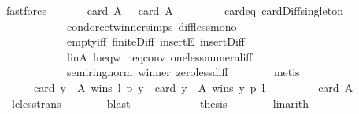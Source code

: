 \begin{isabellebody}
\ fastforce\isanewline
\ \ \ \ \isamarkupfalse%
\ {}{\isacharcolon}{\kern0pt}\ {\isachardoublequoteopen}card\ A\ {\isacharminus}{\kern0pt}{}\ {\isacharless}{\kern0pt}\ card\ A\ {\isacharminus}{\kern0pt}{}{\isachardoublequoteclose}\isanewline
\ \ \ \ \ \ \isamarkupfalse%
\ card{\isacharunderscore}{\kern0pt}{}{\isacharunderscore}{\kern0pt}eq\ card{\isacharunderscore}{\kern0pt}Diff{\isacharunderscore}{\kern0pt}singleton\isanewline
\ \ \ \ \ \ \ \ \ \ \ \ condorcet{\isacharunderscore}{\kern0pt}winner{\isachardot}{\kern0pt}simps\ diff{\isacharunderscore}{\kern0pt}less{\isacharunderscore}{\kern0pt}mono{}\isanewline
\ \ \ \ \ \ \ \ \ \ \ \ empty{\isacharunderscore}{\kern0pt}iff\ finite{\isacharunderscore}{\kern0pt}Diff\ insertE\ insert{\isacharunderscore}{\kern0pt}Diff\isanewline
\ \ \ \ \ \ \ \ \ \ \ \ l{\isacharunderscore}{\kern0pt}in{\isacharunderscore}{\kern0pt}A\ l{\isacharunderscore}{\kern0pt}neq{\isacharunderscore}{\kern0pt}w\ neq{}{\isacharunderscore}{\kern0pt}conv\ one{\isacharunderscore}{\kern0pt}less{\isacharunderscore}{\kern0pt}numeral{\isacharunderscore}{\kern0pt}iff\isanewline
\ \ \ \ \ \ \ \ \ \ \ \ semiring{\isacharunderscore}{\kern0pt}norm{\isacharparenleft}{\kern0pt}{}{}{\isacharparenright}{\kern0pt}\ winner\ zero{\isacharunderscore}{\kern0pt}less{\isacharunderscore}{\kern0pt}diff\isanewline
\ \ \ \ \ \ \isamarkupfalse%
\ metis\isanewline
\ \ \ \ \isamarkupfalse%
\isanewline
\ \ \ \ \ \ {\isachardoublequoteopen}card\ {\isacharbraceleft}{\kern0pt}y\ {\isasymin}\ A{\isachardot}{\kern0pt}\ wins\ l\ p\ y{\isacharbraceright}{\kern0pt}\ {\isacharminus}{\kern0pt}\ card\ {\isacharbraceleft}{\kern0pt}y\ {\isasymin}\ A{\isachardot}{\kern0pt}\ wins\ y\ p\ l{\isacharbraceright}{\kern0pt}\ {\isacharless}{\kern0pt}\isanewline
\ \ \ \ \ \ \ \ card\ A\ {\isacharminus}{\kern0pt}{}{\isachardoublequoteclose}\isanewline
\ \ \ \ \ \ \isamarkupfalse%
\ {\isachardoublequoteopen}{}{\isachardoublequoteclose}\ le{\isacharunderscore}{\kern0pt}less{\isacharunderscore}{\kern0pt}trans\isanewline
\ \ \ \ \ \ \isamarkupfalse%
\ blast\isanewline
\ \ \ \ \isamarkupfalse%
\ {}\isanewline
\ \ \ \ \isamarkupfalse%
\ {\isacharquery}{\kern0pt}thesis\isanewline
\ \ \ \ \ \ \isamarkupfalse%
\ linarith\isanewline
\ \ \isamarkupfalse%
\isanewline
{}\isamarkupfalse%
%
\endisatagproof

\end{isabellebody}
